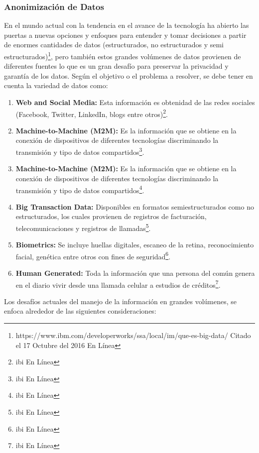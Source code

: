 \documentclass[a4paper,openright,12pt]{book}
\theoremstyle{definition}
\theoremstyle{remark}
\begin{document}
    	\subsubsection{Anonimización de Datos}
En el mundo actual con la tendencia en el avance de la tecnología ha abierto las puertas a nuevas opciones y enfoques para entender y tomar decisiones a partir de enormes cantidades de datos (estructurados, no estructurados y semi estructurados)\footnote{https://www.ibm.com/developerworks/ssa/local/im/que-es-big-data/ Citado el 17 Octubre del 2016 En Línea}, pero también estos grandes volúmenes de datos provienen de diferentes fuentes lo que es un gran desafío para preservar la privacidad y garantía de los datos. Según el objetivo o el problema a resolver, se debe tener en cuenta la variedad de datos como:
\begin{enumerate}
	\item \textbf{Web and Social Media:} Esta información es obtenidad de las redes sociales (Facebook, Twitter, LinkedIn, blogs entre otros)\footnote{ibi En Línea}.
    \item \textbf{Machine-to-Machine (M2M):} Es la información que se obtiene en la conexión de dispositivos de diferentes tecnologías discriminando la transmisión y tipo de datos compartidos\footnote{ibi En Línea}.
    \item \textbf{Machine-to-Machine (M2M):} Es la información que se obtiene en la conexión de dispositivos de diferentes tecnologías discriminando la transmisión y tipo de datos compartidos\footnote{ibi En Línea}.
    \item \textbf{Big Transaction Data:} Disponibles en formatos semiestructurados como no estructurados, los cuales provienen de registros de facturación, telecomunicaciones y registros de llamadas\footnote{ibi En Línea}.
     \item \textbf{Biometrics:} Se incluye huellas digitales, escaneo de la retina, reconocimiento facial, genética entre otros con fines de seguridad\footnote{ibi En Línea}.
     \item \textbf{Human Generated:} Toda la información que una persona del común genera en el diario vivir desde una llamada celular a estudios de créditos\footnote{ibi En Línea}.
\end{enumerate}
Los desafíos actuales del manejo de la información en grandes volúmenes, se enfoca alrededor de las siguientes consideraciones:
\end{document}
